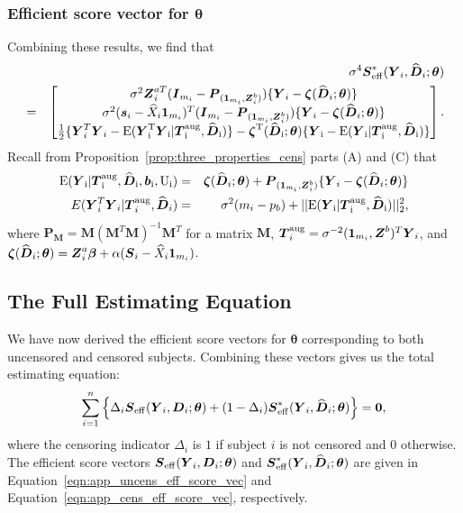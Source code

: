\documentclass[12pt]{article}
\def\bse{\begin{eqnarray*}}
\def\ese{\end{eqnarray*}}
\def\be{\begin{eqnarray}}
\def\ee{\end{eqnarray}}
\def\bse{\begin{eqnarray*}}
\def\ese{\end{eqnarray*}}
\def\bS{{\mathbf S}}
\def\bzero{{\mathbf 0}}
\newcommand{\bzeta}{\mbox{\boldmath $\zeta$}}
\def\bbeta{{\boldsymbol{\beta}}}
\def\btheta{{\boldsymbol{\theta}}}
\def\bzero{{\boldsymbol{0}}}
\def\bone{{\boldsymbol{1}}}
\def\bb{{\boldsymbol b}}
\def\bs{{\boldsymbol s}}
\def\bD{{\boldsymbol D}}
\def\bI{{\boldsymbol I}}
\def\bM{{\boldsymbol M}}
\def\bP{{\boldsymbol P}}
\def\bS{{\boldsymbol S}}
\def\bT{{\boldsymbol T}}
\def\bY{{\boldsymbol Y}}
\def\bZ{{\boldsymbol Z}}
\def\tilD{\bD}
\def\E{\rm E}
\begin{document}
\subsubsection{Efficient score vector for $\btheta$}
Combining these results, we find that
\be
\label{eqn:app_cens_eff_score_vec}
&&\sigma^4\bS_{\rm{eff}}^*(\bY_i,\widehat{\tilD}_i;\btheta)\nonumber\\
&=&\left[
\begin{matrix}
\sigma^2\bZ_i^{aT}(\bI_{m_i} - \bP_{(\bone_{m_i},\bZ^b_i)})\{\bY_i-\bzeta(\widehat{\tilD}_i;\btheta)\} \\
\sigma^2(\bs_i-\widehat{X}_i\bone_{m_i})^T(\bI_{m_i} - \bP_{(\bone_{m_i},\bZ^b_i)})\{\bY_i-\bzeta(\widehat{\tilD}_i;\btheta)\} \\
\frac{1}{2}\{\bY_i^T\bY_i-\E(\bY_i^T\bY_i|\bT_i^{\rm aug},\widehat{\tilD}_i)\}-\bzeta^T(\widehat{\tilD}_i;\btheta)\{\bY_i-\E(\bY_i|\bT_i^{\rm aug},\widehat{\tilD}_i)\}
\end{matrix}
\right].
\ee
Recall from Proposition~\ref{prop:three_properties_cens} parts (A) and (C) that
\bse
\rm{E}(\bY_i|\bT_i^{\rm aug},\widehat{\tilD}_i,\bb_i,U_i)&=&\bzeta(\widehat{\tilD}_i;\btheta)+\bP_{(\bone_{m_i},\bZ_i^b)}\{\bY_i-\bzeta(\widehat{\tilD}_i;\btheta)\}\\
E(\bY_i^T\bY_i|\bT_i^{\rm aug},\widehat{\tilD}_i)&=&\sigma^2(m_i-p_b)+||\rm{E}(\bY_i|\bT_i^{\rm aug},\widehat{\tilD}_i)||^2_2,
\ese
where $\bP_{\bM} = \bM(\bM^T\bM)^{-1}\bM^T$ for a matrix $\bM$, $\bT_i^{\rm aug} = \sigma^{-2}(\bone_{m_i}, \bZ^b)^T\bY_i$, and $\bzeta(\widehat{\tilD}_i;\btheta)=\bZ_i^a\bbeta  + \alpha(\bS_i - \widehat{X}_i\bone_{m_i})$.
\subsection{The Full Estimating Equation}
We have now derived the efficient score vectors for $\btheta$ corresponding to both uncensored and censored subjects. Combining these vectors gives us the total estimating equation:
\be
\label{eqn:app_full_estimating_equation}
\sum_{i=1}^n \left\{\Delta_i\bS_{\rm{eff}}(\bY_i,\tilD_i;\btheta) + (1 - \Delta_i)\bS_{\rm{eff}}^*(\bY_i,\widehat{\tilD}_i;\btheta)\right\}=\bzero,
\ee
where the censoring indicator $\Delta_i$ is $1$ if subject $i$ is not censored and $0$ otherwise. The efficient score vectors $\bS_{\rm{eff}}(\bY_i,\tilD_i;\btheta)$ and $\bS_{\rm{eff}}^*(\bY_i,\widehat{\tilD}_i;\btheta)$ are given in Equation~\eqref{eqn:app_uncens_eff_score_vec} and Equation~\eqref{eqn:app_cens_eff_score_vec}, respectively.
\end{document}

